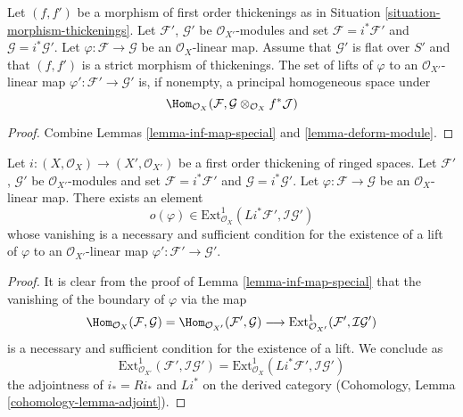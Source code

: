 \begin{lemma}
\label{lemma-inf-map-rel}
Let $(f, f')$ be a morphism of first order thickenings as in
Situation \ref{situation-morphism-thickenings}.
Let $\mathcal{F}'$, $\mathcal{G}'$ be $\mathcal{O}_{X'}$-modules and set
$\mathcal{F} = i^*\mathcal{F}'$ and $\mathcal{G} = i^*\mathcal{G}'$.
Let $\varphi : \mathcal{F} \to \mathcal{G}$ be an $\mathcal{O}_X$-linear map.
Assume that $\mathcal{G}'$ is flat over $S'$ and that
$(f, f')$ is a strict morphism of thickenings.
The set of lifts of $\varphi$ to an $\mathcal{O}_{X'}$-linear map
$\varphi' : \mathcal{F}' \to \mathcal{G}'$ is, if nonempty, a principal
homogeneous space under
$$
\Hom_{\mathcal{O}_X}(\mathcal{F},
\mathcal{G} \otimes_{\mathcal{O}_X} f^*\mathcal{J})
$$
\end{lemma}

\begin{proof}
Combine Lemmas \ref{lemma-inf-map-special} and \ref{lemma-deform-module}.
\end{proof}

\begin{lemma}
\label{lemma-inf-obs-map-special}
Let $i : (X, \mathcal{O}_X) \to (X', \mathcal{O}_{X'})$
be a first order thickening of ringed spaces.
Let $\mathcal{F}'$, $\mathcal{G}'$ be $\mathcal{O}_{X'}$-modules and set
$\mathcal{F} = i^*\mathcal{F}'$ and $\mathcal{G} = i^*\mathcal{G}'$.
Let $\varphi : \mathcal{F} \to \mathcal{G}$ be an $\mathcal{O}_X$-linear map.
There exists an element
$$
o(\varphi) \in
\text{Ext}^1_{\mathcal{O}_X}(Li^*\mathcal{F}',
\mathcal{I}\mathcal{G}')
$$
whose vanishing is a necessary and sufficient condition for the
existence of a lift of $\varphi$ to an $\mathcal{O}_{X'}$-linear map
$\varphi' : \mathcal{F}' \to \mathcal{G}'$.
\end{lemma}

\begin{proof}
It is clear from the proof of Lemma \ref{lemma-inf-map-special} that the
vanishing of the boundary of $\varphi$ via the map
$$
\Hom_{\mathcal{O}_X}(\mathcal{F}, \mathcal{G}) =
\Hom_{\mathcal{O}_{X'}}(\mathcal{F}', \mathcal{G}) \longrightarrow
\text{Ext}^1_{\mathcal{O}_{X'}}(\mathcal{F}', \mathcal{I}\mathcal{G}')
$$
is a necessary and sufficient condition for the existence of a lift. We
conclude as
$$
\text{Ext}^1_{\mathcal{O}_{X'}}(\mathcal{F}', \mathcal{I}\mathcal{G}') =
\text{Ext}^1_{\mathcal{O}_X}(Li^*\mathcal{F}', \mathcal{I}\mathcal{G}')
$$
the adjointness of $i_* = Ri_*$ and $Li^*$ on the derived category
(Cohomology, Lemma \ref{cohomology-lemma-adjoint}).
\end{proof}

